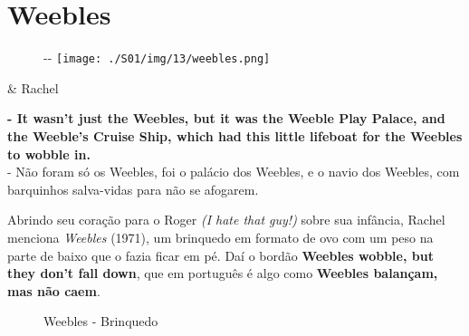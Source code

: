 \hypertarget{weebles}{%
\section{Weebles}\label{weebles}}

\begin{figure}[!ht]
  \begin{adjustwidth}{-\oddsidemargin-1in}{-\rightmargin}
    \centering
    \texttt{[image: ./S01/img/13/weebles.png]}
  \end{adjustwidth}
\end{figure}

\begin{tcolorbox}[enhanced,center upper,
    drop fuzzy shadow southeast, boxrule=0.3pt,
    lower separated=false,
    colframe=black!30!dialogoBorder,colback=white]
\begin{minipage}[c]{0.16\linewidth}
   & \centering \scriptsize{Rachel}
\end{minipage}
\hfill
\begin{minipage}[c]{0.8\linewidth}
  \textbf{- It wasn't just the Weebles, but it was the Weeble Play Palace, and the Weeble's Cruise Ship, which had this little lifeboat for the Weebles to wobble in.}\\
  - Não foram só os Weebles, foi o palácio dos Weebles, e o navio dos Weebles, com barquinhos salva-vidas para não se afogarem.
\end{minipage}
\end{tcolorbox}

Abrindo seu coração para o Roger \emph{(I hate that guy!)} sobre sua
infância, Rachel menciona \emph{Weebles} (1971), um brinquedo em formato
de ovo com um peso na parte de baixo que o fazia ficar em pé. Daí o
bordão \textbf{Weebles wobble, but they don't fall down}, que em
português é algo como \textbf{Weebles balançam, mas não caem}.

\begin{figure}
  \centering
    \caption{Weebles - Brinquedo\label{fig:weebles-brinquedo}}
\end{figure}

